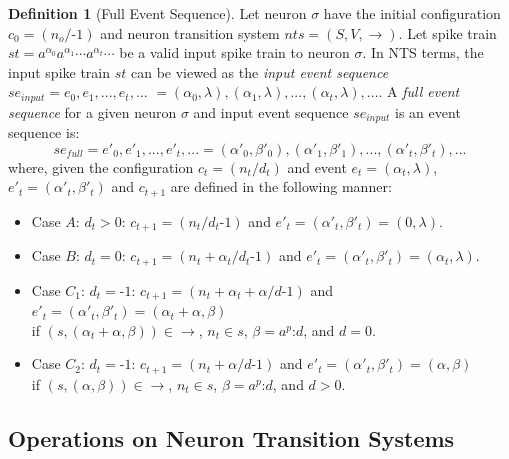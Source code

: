 \documentclass[]{elsarticle}
\theoremstyle{definition}
\newtheorem{definition2}{Definition}
\theoremstyle{definition}
\newcommand{\ra}{\rightarrow}
\newcommand{\sm}{\text{:}}
\newcommand{\mn}{\text{-}}
\begin{document}

\begin{definition2}[Full Event Sequence]

Let neuron $\sigma$ have the initial configuration $c_0 = (n_o/\mn 1)$ and neuron transition system 
$nts=(S,V,\ra)$. Let spike train $st = a^{\alpha_0}a^{\alpha_1}\cdots a^{\alpha_t} \cdots$  be a 
valid input spike train to neuron $\sigma$. In NTS terms, the input spike train $st$ can be viewed 
as the \emph{input event sequence} $se_{input} = e_0,e_1,...,e_t,...$  $=(\alpha_0, \lambda),
(\alpha_1,\lambda),...,(\alpha_t,\lambda),...$. A \emph{full event sequence} for a given neuron 
$\sigma$  and input event sequence $se_{input}$ is an event sequence is: 
$$se_{full} = e'_0,e'_1,...,e'_t,... = (\alpha'_0,\beta'_0),(\alpha'_1,\beta'_1),...,(\alpha'_t,
\beta'_t),...$$ where, given the configuration $c_t = (n_t/d_t)$ and event $e_t = (\alpha_t,
\lambda)$, $e'_t=(\alpha'_t, \beta'_t)$ and $c_{t+1}$ are defined in the following manner:
\begin{itemize}
   \item Case $A$: $d_t > 0$: $c_{t+1} = (n_t/d_t\mn 1)$ and $e'_t = (\alpha'_t,\beta'_t) = (0,\lambda)$.
   \item Case $B$: $d_t = 0$: $c_{t+1} = (n_t+\alpha_t/d_t\mn 1)$ and $e'_t = (\alpha'_t,\beta'_t) = 
         (\alpha_t,\lambda)$.
   \item Case $C_1$: $d_t = \mn 1$: $c_{t+1} = (n_t+\alpha_t + \alpha/d\mn 1)$ and $e'_t =(\alpha'_t,
         \beta'_t) = (\alpha_t+\alpha, \beta)$ \\ if $(s,(\alpha_t+\alpha, \beta ))\in \ra$, 
         $n_t \in s$, $\beta = a^p\sm d$, and $d=0$.
   \item Case $C_2$: $d_t = \mn 1$: $c_{t+1} = (n_t+ \alpha/d\mn 1)$ and $e'_t =(\alpha'_t,
         \beta'_t) = (\alpha, \beta)$ \\ if $(s,(\alpha, \beta ))\in \ra$, $n_t \in s$, 
         $\beta = a^p\sm d$, and $d>0$.
\end{itemize}

\end{definition2}

\subsection{Operations on Neuron Transition Systems}\label{sec-homo-ops}
\end{document}
